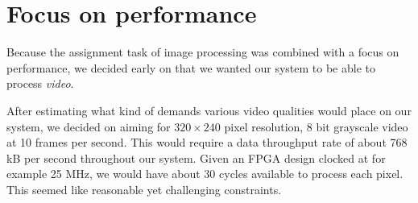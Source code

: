 \section{Focus on performance}\label{sec:perf-focus}

Because the assignment task of image processing was combined with a
focus on performance, we decided early on that we wanted our system to
be able to process \emph{video}.

After estimating what kind of demands various video qualities would
place on our system, we decided on aiming for $320\times240$ pixel
resolution, 8 bit grayscale video at 10 frames per second. This would
require a data throughput rate of about 768 kB per second throughout our
system. Given an FPGA design clocked at for example 25 MHz, we would
have about 30 cycles available to process each pixel. This seemed
like reasonable yet challenging constraints.
